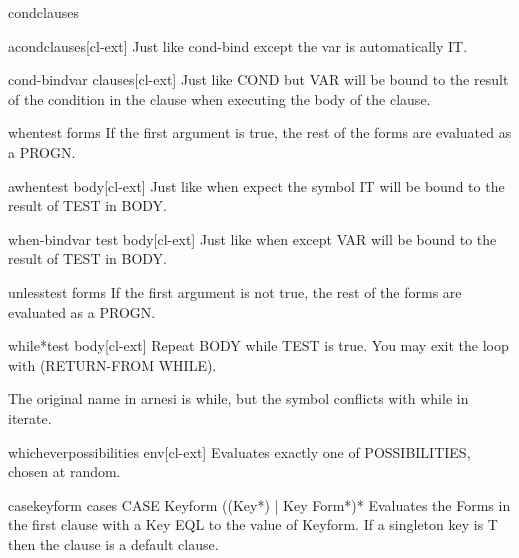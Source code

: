 \documentclass[10pt,english]{book}
\begin{document}
\begin{macro}{cond}{\rest clauses}
  
\end{macro}

\begin{macro}{acond}{\rest clauses}[cl-ext]
  Just like cond-bind except the var is automatically IT.
\end{macro}

\begin{macro}{cond-bind}{var \body clauses}[cl-ext]
  Just like COND but VAR will be bound to the result of the
  condition in the clause when executing the body of the clause.
\end{macro}

\begin{macro}{when}{test \body forms}
  If the first argument is true, the rest of the forms are
evaluated as a PROGN.
\end{macro}

\begin{macro}{awhen}{test \body body}[cl-ext]
  Just like when expect the symbol IT will be
  bound to the result of TEST in BODY.
\end{macro}

\begin{macro}{when-bind}{var test \body body}[cl-ext]
  Just like when except VAR will be bound to the
  result of TEST in BODY.
\end{macro}

\begin{macro}{unless}{test \body forms}
  If the first argument is not true, the rest of the forms are
evaluated as a PROGN.
\end{macro}

\begin{macro}{while*}{test \body body}[cl-ext]
  Repeat BODY while TEST is true. You may exit the loop with
  (RETURN-FROM WHILE).
  \begin{devnote}
    The original name in arnesi is while, but the symbol conflicts
    with while in iterate.
  \end{devnote}
\end{macro}

\begin{macro}{whichever}{\rest possibilities \env env}[cl-ext]
  Evaluates exactly one of POSSIBILITIES, chosen at random.
\end{macro}

\begin{macro}{case}{keyform \body cases}
  CASE Keyform {({(Key*) | Key} Form*)}*
  Evaluates the Forms in the first clause with a Key EQL to the value of
  Keyform. If a singleton key is T then the clause is a default clause.
\end{macro}
\end{document}
